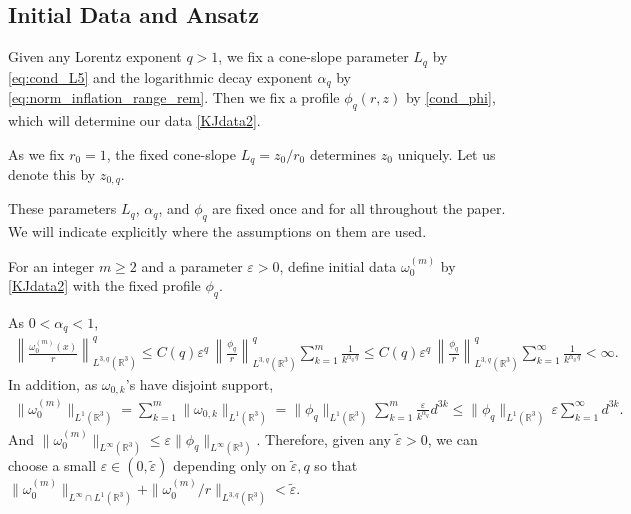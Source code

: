 \documentclass[reqno,11pt]{amsart}
\begin{document}
\subsection{Initial Data and Ansatz}
\label{sec:ini_data_ansatz}
Given any Lorentz exponent $q>1$, we fix
a cone-slope parameter $L_q$ by \eqref{eq:cond_L5} and the logarithmic decay exponent $\alpha_q$ by \eqref{eq:norm_inflation_range_rem}. Then we fix a profile $\phi_q(r,z)$ by \eqref{cond_phi}, which will determine our data \eqref{KJdata2}.

As we fix $r_0=1$, the fixed cone-slope $L_q=z_0/r_0$ determines $z_0$ uniquely. Let us denote this by $z_{0,q}$.


These parameters $L_q$, $\alpha_q$, and $\phi_q$ are fixed once and for all throughout the paper.  We will indicate explicitly where the assumptions on them are used.  
 


For an integer $m\geq2$ and a parameter $\varepsilon>0$, define initial data  $\omega_0^{(m)}$ by \eqref{KJdata2} with the fixed profile $\phi_q $.

As $0<\alpha_q<1$,
\begin{align}
\label{ini_lorentz14}
        \left\| 
        \frac{\omega_0^{(m)}(x)}{r}  
        \right \|^q_{L^{3,q}(\mathbb{R}^3)}
    \leq C(q)
        \varepsilon^q \,\left\|\frac{\phi_q}{r} \right\|_{L^{3,q}(\mathbb{R}^3)}^q    \sum_{k=1}^m \frac{1}{k^{\alpha_q\,  q}}
\leq C(q)
        \varepsilon^q \,\left\|\frac{\phi_q}{r} \right\|_{L^{3,q}(\mathbb{R}^3)}^q    \sum_{k=1}^\infty \frac{1}{k^{\alpha_q\,  q}}
    <\infty.
\end{align}
In addition, as $\omega_{0,k}$'s have  disjoint support,
    \begin{align*}
        \|\omega_0^{(m)}\|_{L^1(\mathbb{R}^3)}
        =\sum_{k=1}^m \|\omega_{0,k}\|_{L^1(\mathbb{R}^3)} =
        \|\phi_q\|_{L^1(\mathbb{R}^3)}
        \sum_{k=1}^m
        \frac{\varepsilon}{k^{\alpha_q}}
        d^{3k} 
        \leq
        \|\phi_q\|_{L^1(\mathbb{R}^3)}
        \, \varepsilon
        \sum_{k=1}^\infty d^{3k}.
    \end{align*}
And $\|\omega_0^{(m)}\|_{L^\infty(\mathbb{R}^3)}\leq \varepsilon \|\phi_q\|_{L^\infty(\mathbb{R}^3)}. $
Therefore, given any $\tilde \varepsilon>0$, we can choose a small $\varepsilon\in(0,\tilde \varepsilon)$ depending only on $\tilde \varepsilon, q$  so that $\|\omega_0^{(m)}\|_{L^\infty\cap L^{1}(\mathbb{R}^3) } +\|\omega_0^{(m)}/r\|_{L^{3,q}(\mathbb{R}^3)}<\tilde \varepsilon$.  
\end{document}
